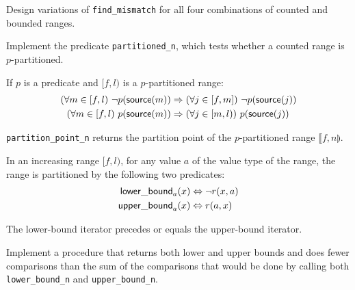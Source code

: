 \begin{exercise}
	Design variations of \verb|find_mismatch| for all four combinations of counted
	and bounded ranges.
\end{exercise}



\begin{exercise}
	Implement the predicate \verb|partitioned_n|, which tests whether a counted
	range is $p$-partitioned.
\end{exercise}



\begin{lemma}
	If $p$ is a predicate and $[f, l)$ is a $p$-partitioned range:
	\begin{align*}
		(\forall m \in [f, l)\ \lnot p(\mathsf{source}(m)) &\Rightarrow (\forall j \in [f, m])\ \lnot p(\mathsf{source}(j))\\
		(\forall m \in [f, l)\ p(\mathsf{source}(m)) &\Rightarrow (\forall j \in [m, l))\ p(\mathsf{source}(j))
	\end{align*}
\end{lemma}

\begin{lemma}
	\verb|partition_point_n| returns the partition point of the $p$-partitioned range
	$\llbracket f, n \rrparenthesis$.
\end{lemma}

\begin{lemma}
	In an increasing range $[f, l)$, for any value $a$ of the value type of the range,
	the range is partitioned by the following two predicates:
	\begin{align*}
		\mathsf{lower\_bound}_a(x) &\Leftrightarrow \lnot r(x, a)\\
		\mathsf{upper\_bound}_a(x) &\Leftrightarrow r(a, x)
	\end{align*}
\end{lemma}

\begin{lemma}
	The lower-bound iterator precedes or equals the upper-bound iterator.
\end{lemma}

\begin{exercise}
	Implement a procedure that returns both lower and upper bounds and does fewer
	comparisons than the sum of the comparisons that would be done by calling both
	\verb|lower_bound_n| and \verb|upper_bound_n|.
\end{exercise}

